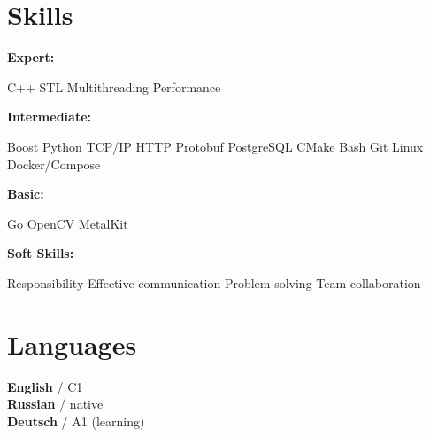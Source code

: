 \documentclass[]{deedy-resume}
\begin{document}
\begin{minipage}[t]{0.25\textwidth}


\section{Skills}

\textbf{Expert:}
\begin{skillitemize}
    \skillitem C++ 
    \skillitem STL
    \skillitem Multithreading
    \skillitem Performance
\end{skillitemize}

\textbf{Intermediate:}
\begin{skillitemize}
    \skillitem Boost
    \skillitem Python
    \skillitem TCP/IP
    \skillitem HTTP
    \skillitem Protobuf
    \skillitem PostgreSQL
    \skillitem CMake
    \skillitem Bash
    \skillitem Git
    \skillitem Linux
    \skillitem Docker/Compose
\end{skillitemize}

\textbf{Basic:}
\begin{skillitemize}
    \skillitem Go
    \skillitem OpenCV
    \skillitem MetalKit
\end{skillitemize}

\sectionspace 

\textbf{Soft Skills:}
\begin{skillitemize}
    \skillitem Responsibility
    \skillitem Effective communication
    \skillitem Problem-solving
    \skillitem Team collaboration
\end{skillitemize}

\sectionspace


\section{Languages}
\textbf{English} / C1 \\
\textbf{Russian} / native \\
\textbf{Deutsch} / A1 (learning)

\sectionspace



\end{minipage}
\end{document}
